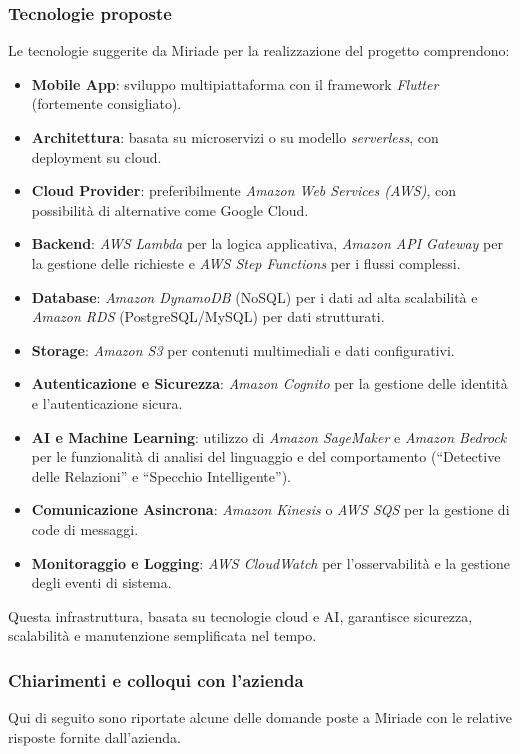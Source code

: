 \documentclass[a4paper,11pt]{article}
\begin{document}
\subsubsection{Tecnologie proposte}
Le tecnologie suggerite da Miriade per la realizzazione del progetto comprendono:
\begin{itemize}
    \item \textbf{Mobile App}: sviluppo multipiattaforma con il framework \textit{Flutter} (fortemente consigliato).
    \item \textbf{Architettura}: basata su microservizi o su modello \textit{serverless}, con deployment su cloud.
    \item \textbf{Cloud Provider}: preferibilmente \textit{Amazon Web Services (AWS)}, con possibilità di alternative come Google Cloud.
    \item \textbf{Backend}: \textit{AWS Lambda} per la logica applicativa, \textit{Amazon API Gateway} per la gestione delle richieste e \textit{AWS Step Functions} per i flussi complessi.
    \item \textbf{Database}: \textit{Amazon DynamoDB} (NoSQL) per i dati ad alta scalabilità e \textit{Amazon RDS} (PostgreSQL/MySQL) per dati strutturati.
    \item \textbf{Storage}: \textit{Amazon S3} per contenuti multimediali e dati configurativi.
    \item \textbf{Autenticazione e Sicurezza}: \textit{Amazon Cognito} per la gestione delle identità e l'autenticazione sicura.
    \item \textbf{AI e Machine Learning}: utilizzo di \textit{Amazon SageMaker} e \textit{Amazon Bedrock} per le funzionalità di analisi del linguaggio e del comportamento (``Detective delle Relazioni'' e ``Specchio Intelligente'').
    \item \textbf{Comunicazione Asincrona}: \textit{Amazon Kinesis} o \textit{AWS SQS} per la gestione di code di messaggi.
    \item \textbf{Monitoraggio e Logging}: \textit{AWS CloudWatch} per l'osservabilità e la gestione degli eventi di sistema.
\end{itemize}
Questa infrastruttura, basata su tecnologie cloud e AI, garantisce sicurezza, scalabilità e manutenzione semplificata nel tempo.

\subsubsection{Chiarimenti e colloqui con l'azienda}
Qui di seguito sono riportate alcune delle domande poste a Miriade con le relative risposte fornite dall'azienda. 
\end{document}

